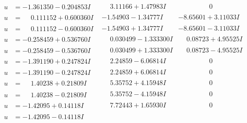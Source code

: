 \documentclass[1p]{elsarticle_modified}
\theoremstyle{definition}
\begin{document}
$$\begin{array}{c|c|c}
 \hline 
\begin{aligned}
u &= -1.361350 - 0.204853 I\end{aligned}
 & \phantom{-}3.11166 + 1.47983 I & \phantom{-0.000000 } 0 \\ \hline\begin{aligned}
u &= \phantom{-}0.111152 + 0.600360 I\end{aligned}
 & -1.54903 - 1.34777 I & -8.65601 + 3.11033 I \\ \hline\begin{aligned}
u &= \phantom{-}0.111152 - 0.600360 I\end{aligned}
 & -1.54903 + 1.34777 I & -8.65601 - 3.11033 I \\ \hline\begin{aligned}
u &= -0.258459 + 0.536760 I\end{aligned}
 & \phantom{-}0.030499 - 1.333300 I & \phantom{-}0.08723 + 4.95525 I \\ \hline\begin{aligned}
u &= -0.258459 - 0.536760 I\end{aligned}
 & \phantom{-}0.030499 + 1.333300 I & \phantom{-}0.08723 - 4.95525 I \\ \hline\begin{aligned}
u &= -1.391190 + 0.247824 I\end{aligned}
 & \phantom{-}2.24859 - 6.06814 I & \phantom{-0.000000 } 0 \\ \hline\begin{aligned}
u &= -1.391190 - 0.247824 I\end{aligned}
 & \phantom{-}2.24859 + 6.06814 I & \phantom{-0.000000 } 0 \\ \hline\begin{aligned}
u &= \phantom{-}1.40238 + 0.21809 I\end{aligned}
 & \phantom{-}5.35752 + 4.15948 I & \phantom{-0.000000 } 0 \\ \hline\begin{aligned}
u &= \phantom{-}1.40238 - 0.21809 I\end{aligned}
 & \phantom{-}5.35752 - 4.15948 I & \phantom{-0.000000 } 0 \\ \hline\begin{aligned}
u &= -1.42095 + 0.14118 I\end{aligned}
 & \phantom{-}7.72443 + 1.65930 I & \phantom{-0.000000 } 0 \\ \hline\begin{aligned}
u &= -1.42095 - 0.14118 I\end{aligned}

\end{array}$$
\end{document}
